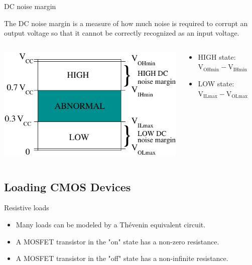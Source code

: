 \begin{frame}{DC noise margin}
  \begin{definition}
    The \alert{DC noise margin} is a measure of how much noise is required to corrupt an output voltage so that it cannot be correctly recognized as an input voltage.
  \end{definition}
  \begin{columns}
    \begin{column}{4cm}
      \includegraphics[scale=0.6]{CMOSLogicLevelsDetailedWithNoiseMargin}
    \end{column}
    \begin{column}{6cm}
      \begin{itemize}
        \item HIGH state: $\textrm{V}_{\textrm{OHmin}} - \textrm{V}_{\textrm{IHmin}}$
        \item LOW state: $\textrm{V}_{\textrm{ILmax}} - \textrm{V}_{\textrm{OLmax}}$
      \end{itemize}
    \end{column}
  \end{columns}
\end{frame}

\subsection{Loading CMOS Devices}

\begin{frame}{Resistive loads}
  \begin{itemize}
    \item Many loads can be modeled by a Th\'evenin equivalent circuit.
    \item A MOSFET transistor in the "on" state has a non-zero resistance.
    \item A MOSFET transistor in the "off" state has a non-infinite resistance.
  \end {itemize}
\end{frame}

